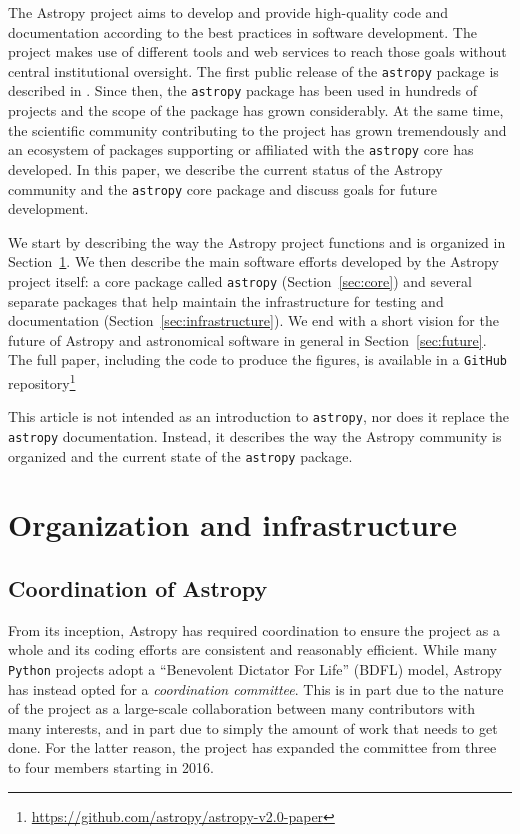\documentclass[modern]{aastex62}
\newcommand{\package}[1]{\texttt{#1}\xspace}
\newcommand{\github}{\package{GitHub}}
\newcommand{\python}{\package{Python}}
\newcommand{\astropy}{Astropy\xspace}
\newcommand{\astropypkg}{\package{astropy}}
\newcommand{\sectionname}{Section\xspace}
\begin{document}
The \astropy project aims to develop and provide high-quality code and
documentation according to the best practices in software development.
The project makes use of different tools and web services to reach those
goals without central institutional oversight.
The first public release of the \astropypkg package is described in
\cite{astropy}. Since then, the \astropypkg package has been
used in hundreds of projects and the scope of the package has grown
considerably. At the same time, the scientific community
contributing to the project has grown tremendously and an ecosystem
of packages supporting or affiliated with the \astropypkg core has
developed.
In this paper, we describe the current status of the \astropy community and the
\astropypkg core package and discuss goals for future development.

We start by describing the way the \astropy project functions and is organized
in \sectionname~\ref{sec:org}. We then describe the main software efforts
developed by the \astropy project itself: a core package called \astropypkg
(\sectionname~\ref{sec:core}) and several separate packages that help maintain
the infrastructure for testing and documentation
(\sectionname~\ref{sec:infrastructure}). We end with a short vision for
the future of \astropy and astronomical software in general in
\sectionname~\ref{sec:future}. The full paper, including the code
to produce the figures, is available in a \github
repository\footnote{\url{https://github.com/astropy/astropy-v2.0-paper}}

This article is not intended as an introduction to \astropypkg, nor does it
replace the \astropypkg documentation. Instead, it describes the way the
\astropy community is organized and the current state of the \astropypkg
package.

\section{Organization and infrastructure}
\label{sec:org}

\subsection{Coordination of Astropy}
\label{sect:coordcom}
From its inception, \astropy has required coordination to ensure the project
as a whole and its coding efforts are consistent and reasonably efficient.
While many \python projects adopt a ``Benevolent Dictator For Life'' (BDFL)
model, \astropy has instead opted for a \emph{coordination committee}.  This
is in part due to the nature of the project as a large-scale collaboration
between many contributors with many interests, and in part due to simply the
amount of work that needs to get done.  For the latter reason, the
project has expanded the committee from three to four members starting in
2016.
\end{document}
